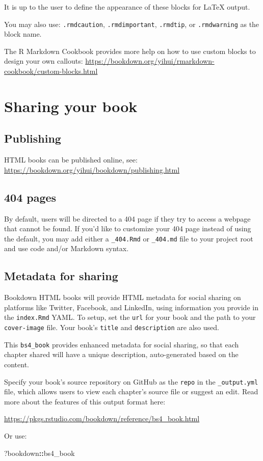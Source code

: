 \documentclass[
]{book}
\newenvironment{Shaded}{\begin{snugshade}}{\end{snugshade}}
\newcommand{\NormalTok}[1]{#1}
\newcommand{\SpecialCharTok}[1]{\textcolor[rgb]{0.81,0.36,0.00}{\textbf{#1}}}
\theoremstyle{definition}
\theoremstyle{definition}
\theoremstyle{definition}
\theoremstyle{definition}
\theoremstyle{remark}
\begin{document}
It is up to the user to define the appearance of these blocks for LaTeX output.

You may also use: \texttt{.rmdcaution}, \texttt{.rmdimportant}, \texttt{.rmdtip}, or \texttt{.rmdwarning} as the block name.

The R Markdown Cookbook provides more help on how to use custom blocks to design your own callouts: \url{https://bookdown.org/yihui/rmarkdown-cookbook/custom-blocks.html}

\chapter{Sharing your book}\label{sharing-your-book}

\section{Publishing}\label{publishing}

HTML books can be published online, see: \url{https://bookdown.org/yihui/bookdown/publishing.html}

\section{404 pages}\label{pages}

By default, users will be directed to a 404 page if they try to access a webpage that cannot be found. If you'd like to customize your 404 page instead of using the default, you may add either a \texttt{\_404.Rmd} or \texttt{\_404.md} file to your project root and use code and/or Markdown syntax.

\section{Metadata for sharing}\label{metadata-for-sharing}

Bookdown HTML books will provide HTML metadata for social sharing on platforms like Twitter, Facebook, and LinkedIn, using information you provide in the \texttt{index.Rmd} YAML. To setup, set the \texttt{url} for your book and the path to your \texttt{cover-image} file. Your book's \texttt{title} and \texttt{description} are also used.

This \texttt{bs4\_book} provides enhanced metadata for social sharing, so that each chapter shared will have a unique description, auto-generated based on the content.

Specify your book's source repository on GitHub as the \texttt{repo} in the \texttt{\_output.yml} file, which allows users to view each chapter's source file or suggest an edit. Read more about the features of this output format here:

\url{https://pkgs.rstudio.com/bookdown/reference/bs4_book.html}

Or use:

\begin{Shaded}
\begin{Highlighting}[]
\NormalTok{?bookdown}\SpecialCharTok{::}\NormalTok{bs4\_book}
\end{Highlighting}
\end{Shaded}


  
\end{document}
